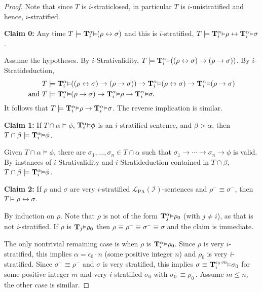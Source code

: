 \documentclass[reqno]{article}
\theoremstyle{definition}
\def\L{\mathscr{L}}
\def\T{\mathbf{T}}
\def\LPA{\L_{\mathrm{PA}}}
\def\indset{\mathcal I}
\renewcommand{\Pr}[1]{\T_{#1}\mbox{\small${\vDash}$}}
\newcommand{\Prr}[2]{\T^{#1}_{#2}\mbox{\small${\vDash}$}}
\newcommand{\claim}[1]{\textbf{Claim #1:}}
\begin{document}
\begin{proof}
Note that since $T$ is $i$-straticlosed, in particular $T$
is $i$-unistratified and hence, $i$-stratified.

\item
\claim0
Any time $T\models \Prr\alpha i(\rho\leftrightarrow\sigma)$
and this is $i$-stratified, $T\models \Prr\alpha i\rho
\leftrightarrow \Prr\alpha i\sigma$.

\item
Assume the hypotheses.  By $i$-Strativalidity,
$T\models \Prr\alpha i((\rho\leftrightarrow\sigma)\rightarrow
(\rho\rightarrow\sigma))$.
By $i$-Stratideduction,
\begin{align*}
&T\models \Prr\alpha i((\rho\leftrightarrow\sigma)
\rightarrow(\rho\rightarrow\sigma))\rightarrow
\Prr\alpha i(\rho\leftrightarrow\sigma)\rightarrow
\Prr\alpha i(\rho\rightarrow\sigma)\\
\mbox{and }
&T\models \Prr\alpha i(\rho\rightarrow\sigma)
\rightarrow\Prr\alpha i\rho\rightarrow\Prr\alpha i\sigma.
\end{align*}
It follows that $T\models \Prr\alpha i\rho\rightarrow\Prr\alpha i\sigma$.
The reverse implication is similar.


\item
\claim1
If $T\cap\alpha\models \phi$, $\Prr\alpha i\phi$ is an $i$-stratified sentence,
and $\beta>\alpha$,
then $T\cap\beta\models\Prr\alpha i\phi$.

\item
Given $T\cap\alpha\models\phi$, there are 
$\sigma_1,\ldots,\sigma_n\in T\cap\alpha$ such that
$\sigma_1\rightarrow\cdots\rightarrow\sigma_n\rightarrow\phi$
is valid.
By instances of $i$-Strativalidity and $i$-Stratideduction
contained in $T\cap\beta$,
$T\cap\beta\models \Prr\alpha i\phi$.

\item
\claim2
If $\rho$ and $\sigma$ are very $i$-stratified $\LPA(\indset)$-sentences 
and $\rho^-\equiv\sigma^-$, then $T\models\rho\leftrightarrow\sigma$.

\item
By induction on $\rho$.  Note that $\rho$ is not of the form 
$\Prr\alpha j\rho_0$ (with $j\not=i$), as that is not $i$-stratified.
If $\rho$ is $\Pr j\rho_0$ then $\rho\equiv\rho^-\equiv\sigma^-\equiv\sigma$ and
the claim is immediate.

The only nontrivial remaining case is when $\rho$ is $\Prr\alpha i\rho_0$.
Since $\rho$ is very $i$-stratified, this implies $\alpha=\epsilon_0\cdot 
n$ (some positive integer $n$) and $\rho_0$
is very $i$-stratified.
Since $\sigma^-\equiv\rho^-$
and $\sigma$ is very stratified,
this implies $\sigma\equiv \Prr{\epsilon_0\cdot m}i\sigma_0$
for some positive integer $m$ and very $i$-stratified $\sigma_0$
with $\sigma^-_0\equiv\rho^-_0$.
Assume $m\leq n$, the other case is similar.


\end{proof}
\end{document}

